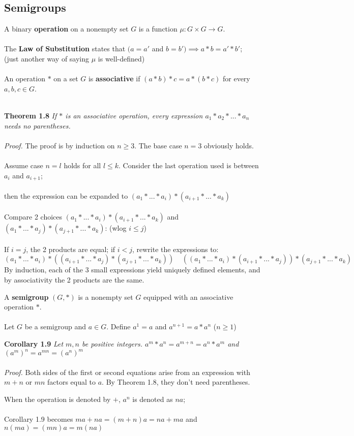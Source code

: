 \documentclass{article}
\begin{document}
\subsection{Semigroups}
A binary \textbf{operation} on a nonempty set \(G\) is a function \(\mu : G\times G\rightarrow G\).\\\\
The \textbf{Law of Substitution} states that \((a=a'\) and \(b=b')\implies a*b=a'*b'\);\\(just another way of saying \(\mu\) is well-defined)\\\\
An operation \(*\) on a set \(G\) is \textbf{associative} if \((a*b)*c=a*(b*c)\) for every \(a,b,c\in G\).\\\\
\begin{redrules}\color{red}
\textbf{Theorem 1.8} \textit{If \(*\) is an associative operation, every expression \(a_1*a_2*...*a_n\) needs no parentheses.}\\\\\color{black}
\textit{Proof.} The proof is by induction on \(n\ge 3\). The base case \(n=3\) obviously holds.\\\\
Assume case \(n=l\) holds for all \(l\le k\). Consider the last operation used is between \(a_i\) and \(a_{i+1}\);\\\\
then the expression can be expanded to \((a_1*...*a_i)*(a_{i+1}*...*a_k)\)\\\\
Compare 2 choices \((a_1*...*a_i)*(a_{i+1}*...*a_k)\) and \((a_1*...*a_j)*(a_{j+1}*...*a_k)\): (wlog \(i\le j\))\\\\
If \(i=j\), the 2 products are equal; if \(i<j\), rewrite the expressions to:
\[(a_1*...*a_i)*((a_{i+1}*...*a_j)*(a_{j+1}*...*a_k))\;\;\;\;((a_1*...*a_i)*(a_{i+1}*...*a_j))*(a_{j+1}*...*a_k)\]
By induction, each of the 3 small expressions yield uniquely defined elements, and by associativity the 2 products are the same.
\end{redrules}
A \textbf{semigroup} \((G,*)\) is a nonempty set \(G\) equipped with an associative operation \(*\).\\\\
Let \(G\) be a semigroup and \(a\in G\). Define \(a^1=a\) and \(a^{n+1}=a*a^n\) (\(n\ge 1\))\\
\begin{greenrules}\color{OliveGreen}
\textbf{Corollary 1.9} \textit{Let \(m,n\) be positive integers. \(a^m*a^n=a^{m+n}=a^n*a^m\) and \((a^m)^n=a^{mn}=(a^n)^m\)}\\\\\color{black}
\textit{Proof.} Both sides of the first or second equations arise from an expression with \(m+n\) or \(mn\) factors equal to \(a\). By \color{gray}Theorem 1.8\color{black}, they don't need parentheses.
\end{greenrules}
When the operation is denoted by \(+\), \(a^n\) is denoted as \(na\);\\\\
\color{gray}Corollary 1.9 \color{black} becomes \(ma+na=(m+n)a=na+ma\) and \(n(ma)=(mn)a=m(na)\)
\end{document}
